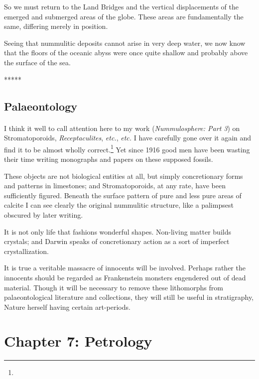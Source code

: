 \documentclass[a4paper, 12pt, oneside]{article}
\begin{document}
So we must return to the Land Bridges and the vertical displacements of the emerged and submerged areas of the globe. These areas are fundamentally the same, differing merely in position.

Seeing that nummulitic deposits cannot arise in very deep water, we now know that the floors of the oceanic abyss were once quite shallow and probably above the surface of the sea.

\centerline{*\hspace{15mm}*\hspace{15mm}*\hspace{15mm}*\hspace{15mm}*}
\bigskip

\subsection{Palaeontology}
\paragraph{}
I think it well to call attention here to my work (\emph{Nummulosphere: Part 3}) on Stromatoporoids, \emph{Receptaculites}, \emph{etc.}, \emph{etc.} I have carefully gone over it again and find it to be almost wholly correct.\footnote{} Yet since 1916 good men have been wasting their time writing monographs and papers on these supposed fossils.

These objects are not biological entities at all, but simply concretionary forms and patterns in limestones; and Stromatoporoids, at any rate, have been sufficiently figured. Beneath the surface pattern of pure and less pure areas of calcite I can see clearly the original nummulitic structure, like a palimpsest obscured by later writing.

It is not only life that fashions wonderful shapes. Non-living matter builds crystals; and Darwin speaks of concretionary action as a sort of imperfect crystallization.

It is true a veritable massacre of innocents will be involved. Perhaps rather the innocents should be regarded as Frankenstein monsters engendered out of dead material. Though it will be necessary to remove these lithomorphs from palaeontological literature and collections, they will still be useful in stratigraphy, Nature herself having certain art-periods.
\clearpage
\section{Chapter 7: Petrology}
\end{document}
